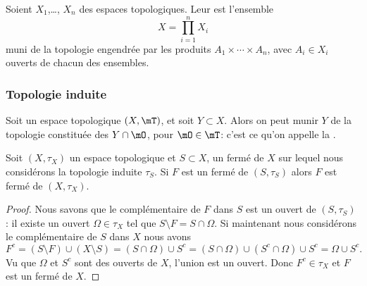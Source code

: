 \begin{definition}      \label{DefIINHooAAjTdY}
    Soient \( X_1\),\ldots, \( X_n\) des espaces topologiques. Leur  est l'ensemble
    \begin{equation}
        X=\prod_{i=1}^nX_i
    \end{equation}
    muni de la topologie engendrée par les produits \(A_1\times \cdots\times A_n\), avec \( A_i\in X_i \) ouverts de chacun des ensembles.
\end{definition}

\subsubsection{Topologie induite}

\begin{definition} \label{DefVLrgWDB}
  Soit un espace topologique \( (X, \mT) \), et soit \( Y \subset X \). Alors on peut munir \( Y \) de la topologie constituée des \( Y \cap \mO \), pour \( \mO \in \mT \): c'est ce qu'on appelle la .
\end{definition}

\begin{lemma}        \label{LemBWSUooCCGvax}
    Soit \( (X,\tau_X)\) un espace topologique et \( S\subset X\), un fermé de \( X\) sur lequel nous considérons la topologie induite \( \tau_S\). Si \( F\) est un fermé de \( (S,\tau_S)\) alors \( F\) est fermé de \( (X,\tau_X)\).
\end{lemma}

\begin{proof}
    Nous savons que le complémentaire de \( F\) dans \( S\) est un ouvert de \( (S,\tau_S)\) : il existe un ouvert \( \Omega\in \tau_X\) tel que \( S\setminus F=S\cap \Omega\). Si maintenant nous considérons le complémentaire de \( S\) dans \( X\) nous avons
    \begin{equation}
        F^c=(S\setminus F)\cup (X\setminus S)=(S\cap \Omega)\cup S^c=(S\cap \Omega)\cup(S^c\cap \Omega)\cup S^c=\Omega\cup S^c.
    \end{equation}
    Vu que \( \Omega\) et \( S^c\) sont des ouverts de \( X\), l'union est un ouvert. Donc \( F^c\in \tau_X\) et \( F\) est un fermé de \( X\).
\end{proof}

